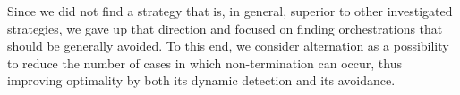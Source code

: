 Since we did not find a strategy that is, in general, superior to other investigated strategies, we gave up that direction and focused on finding orchestrations that should be generally avoided.
To this end, we consider alternation as a possibility to reduce the number of cases in which non-termination can occur, thus improving optimality by both its dynamic detection and its avoidance.







